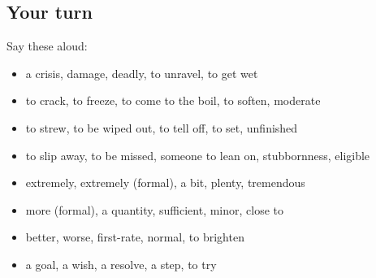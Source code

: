 \subsection*{Your turn}
Say these aloud:

\begin{itemize}
\raggedright
  \item a crisis, damage, deadly, to unravel, to get wet
  \item to crack, to freeze, to come to the boil, to soften, moderate
  \item to strew, to be wiped out, to tell off, to set, unfinished
  \item to slip away, to be missed, someone to lean on, stubbornness, eligible
  \item extremely, extremely (formal), a bit, plenty, tremendous
  \item more (formal), a quantity, sufficient, minor, close to
  \item better, worse, first-rate, normal, to brighten
  \item a goal, a wish, a resolve, a step, to try
\end{itemize}

